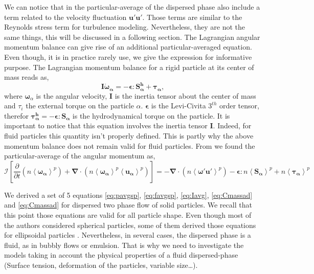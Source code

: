 We can notice that in the particular-average of the dispersed phase also include a term related to the velocity fluctuation $\bm{u'u'}$. 
Those terms are similar to the Reynolds stress term for turbulence modeling.
Nevertheless, they are not the same things, this will be discussed in a following section. 
The Lagrangian angular momentum balance can give rise of an additional particular-averaged equation. 
Even though, it is in practice rarely use, we give the expression for informative purpose.
The Lagrangian momentum balance for a rigid particle at its center of mass reads as,
\begin{equation}
    \mathcal{\bm{I}}\bm{\dot{\omega}_\alpha} = - \bm{\epsilon} : \bm{S^h_\alpha} + \bm{\tau_\alpha},
    \label{eq:newtion2law2}
\end{equation}
where $\bm{\omega}_\alpha$ is the angular velocity, $\mathcal{\bm{I}}$ is the inertia tensor about the center of mass and $\tau_i$ the external torque on the particle $\alpha$. 
$\bm{\epsilon}$ is the Levi-Civita $3^{th}$ order tensor, therefor $\bm{\tau^h_\alpha} = - \bm{\epsilon} : \bm{S_\alpha}$ is the hydrodynamical torque on the particle.  
It is important to notice that this equation involves the inertia tensor $\mathcal{\bm{I}}$.
Indeed, for fluid particles this quantity isn't properly defined.
This is partly why the above momentum balance does not remain valid for fluid particles.
From \citet{jackson1997locally} we found the particular-average of the angular momentum as,
\begin{equation}
    \bm{\mathcal{I}} \left[\frac{\partial}{\partial t}(n\left<\bm{\omega_\alpha}\right>^p)+\bm{\nabla}\cdot(n\left<\bm{\omega_\alpha }\right>^p\left<\bm{u_\alpha}\right>^p)\right] = -\bm{\nabla}\cdot(n\left<\bm{\omega'u'}\right>^p) - \bm{\epsilon} : n\left<\bm{S_\alpha}\right>^p + n\left<\bm{\tau_\alpha}\right>^p
    \label{eq:Iavg}
\end{equation}




We derived a set of 5 equations \ref{eq:pavgsp}, \ref{eq:favgsp}, \ref{eq:Iavg}, \ref{eq:Cmassad} and \ref{eq:Cmassad} for dispersed two phase flow of solid particles. 
We recall that this point those equations are valid for all particle shape. 
Even though most of the authors considered spherical particles, some of them derived those equations for ellipsoidal particles \citep{batchelor1970stress}.
Nevertheless, in several cases, the dispersed phase is  a fluid, as in bubbly flows or emulsion. 
That is why we need to investigate the models taking in account the physical properties of a fluid dispersed-phase (Surface tension, deformation of the particles, variable size\ldots).


